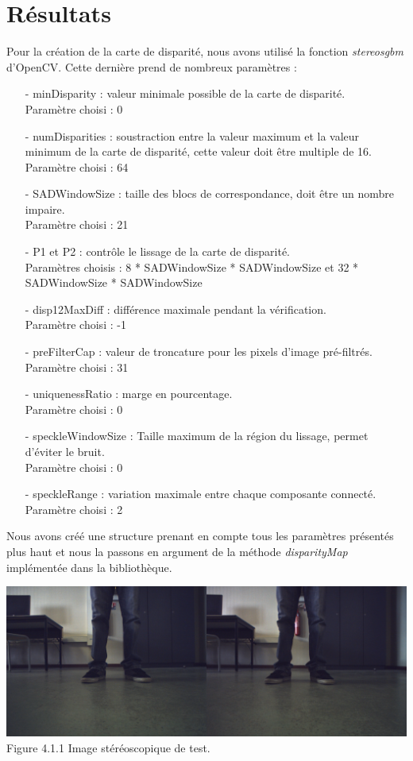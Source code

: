 \documentclass[12pt,a4paper]{report}
\begin{document}
\section{Résultats}
Pour la création de la carte de disparité, nous avons utilisé la fonction \textit{stereosgbm} d'OpenCV. Cette dernière prend de nombreux paramètres : 
\begin{enumerate}
\item[-] minDisparity : valeur minimale possible de la carte de disparité.\\
Paramètre choisi : 0
\item[-] numDisparities : soustraction entre la valeur maximum et la valeur minimum de la carte de disparité, cette valeur doit être multiple de 16.\\
Paramètre choisi : 64
\item[-] SADWindowSize : taille des blocs de correspondance, doit être un nombre impaire.\\
Paramètre choisi : 21
\item[-] P1 et P2 : contrôle le lissage de la carte de disparité.\\
Paramètres choisis : 8 * SADWindowSize * SADWindowSize et 32 * SADWindowSize * SADWindowSize
\item[-] disp12MaxDiff : différence maximale pendant la vérification.\\
Paramètre choisi : -1
\item[-] preFilterCap : valeur de troncature pour les pixels d'image pré-filtrés.\\
Paramètre choisi : 31
\item[-] uniquenessRatio : marge en pourcentage.\\
Paramètre choisi : 0
\item[-] speckleWindowSize : Taille maximum de la région du lissage, permet d'éviter le bruit.\\
Paramètre choisi : 0
\item[-] speckleRange : variation maximale entre chaque composante connecté.
Paramètre choisi : 2
\end{enumerate}

Nous avons créé une structure prenant en compte tous les paramètres présentés plus haut et nous la passons en argument de la méthode \textit{disparityMap} implémentée dans la bibliothèque.\\

\begin{center}
		\includegraphics[scale=0.32]{img_0.png}\\
		Figure 4.1.1 Image stéréoscopique de test.
\end{center}
\end{document}
